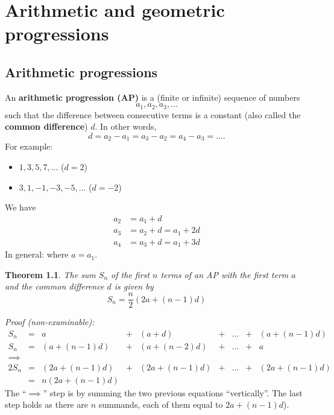 \documentclass[
  12pt,
  oneside]{book}
\providecommand{\tightlist}{%
  \setlength{\itemsep}{0pt}\setlength{\parskip}{0pt}}
\newtheorem{theorem}{Theorem}[chapter]
\theoremstyle{definition}
\theoremstyle{definition}
\theoremstyle{definition}
\theoremstyle{definition}
\theoremstyle{remark}
\begin{document}
\hypertarget{arithmetic-and-geometric-progressions}{%
\chapter{Arithmetic and geometric progressions}\label{arithmetic-and-geometric-progressions}}

\hypertarget{arithmetic-progressions}{%
\section{Arithmetic progressions}\label{arithmetic-progressions}}

An \textbf{arithmetic progression (AP)} is a (finite or infinite) sequence of numbers
\[
a_1,a_2,a_3,\dots
\]
such that the difference between consecutive terms is a constant (also called the \textbf{common difference}) \(d\). In other words,
\[
d=a_2-a_1=a_3-a_2=a_4-a_3=\dots.
\]
For example:

\begin{itemize}
\tightlist
\item
  \(1,3,5,7,\dots\) \quad (\(d=2\))
\item
  \(3,1,-1,-3,-5,\dots\) \quad (\(d=-2\))
\end{itemize}

We have
\begin{align*}
    a_2&=a_1+d\\
    a_3&=a_2+d=a_1+2d \\
    a_4&=a_3+d=a_1+3d
\end{align*}
In general:  where \(a=a_1\).

\begin{theorem}
The sum \(S_n\) of the first \(n\) terms of an AP with the first term \(a\) and the common difference \(d\) is given by
\[
\boxed{S_n=\frac{n}2\left(2a+(n-1)d\right)}
\]
\end{theorem}

\emph{Proof (non-examinable):}
\[
\begin{array}{ccccccccc}
S_n &=& a & + & (a+d) & + & \dots & + & (a+(n-1)d) \\
S_n &=& (a+(n-1)d) & + & (a+(n-2)d) & + &  \dots & + & a\\
\implies \\
2S_n & = & (2a+(n-1)d) & + & (2a+(n-1)d) & + & \dots & + & (2a+(n-1)d)\\
& = & n(2a+(n-1)d)
\end{array}
\]
The ``\(\implies\)'' step is by summing the two previous equations ``vertically''. The last step holds as there are \(n\) summands, each of them equal to \(2a+(n-1)d\)).
\end{document}
